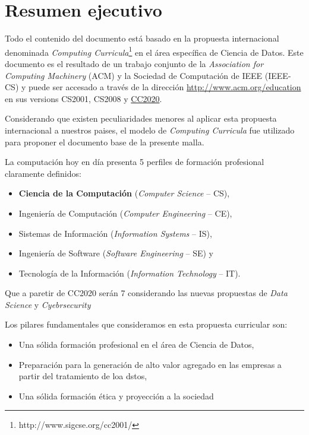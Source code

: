 \chapter*{Resumen ejecutivo}
\AbstractIntro

Todo el contenido del documento está basado en la propuesta internacional denominada \textit{Computing Curricula}\footnote{http://www.sigcse.org/cc2001/} 
en el área especí­fica de Ciencia de Datos. Este documento es el resultado de un trabajo conjunto de la 
\textit{Association for Computing Machinery} (ACM) y la Sociedad de Computación de IEEE (IEEE-CS) y 
puede ser accesado a través de la dirección \href{http://www.acm.org/education}{http://www.acm.org/education} 
en sus versions CS2001, CS2008 y \href{cs2020.net}{CC2020}.

Considerando que existen peculiaridades menores al aplicar esta propuesta internacional a nuestros paises, el modelo de \textit{Computing Curricula} 
fue utilizado para proponer el documento base de la presente malla. 

\noindent La computación hoy en dí­a presenta 5 perfiles de formación profesional claramente definidos: 
\begin{itemize}
\item \textbf{Ciencia de la Computación} (\textit{Computer Science} -- CS),
\item Ingenierí­a de Computación (\textit{Computer Engineering} -- CE),
\item Sistemas de Información (\textit{Information Systems} -- IS),
\item Ingenierí­a de Software (\textit{Software Engineering} -- SE) y 
\item Tecnologí­a de la Información (\textit{Information Technology} -- IT).
\end{itemize}

Que a paretir de CC2020 serán 7 considerando las nuevas propuestas de {\it Data Science} y {\it Cyebrsecurity} 

Los pilares fundamentales que consideramos en esta propuesta curricular son:
\begin{itemize}
\item Una sólida formación profesional en el área de Ciencia de Datos,
\item Preparación para la generación de alto valor agregado en las empresas a partir del tratamiento de loa dstos,
\item Una sólida formación ética y proyección a la sociedad
\end{itemize}

